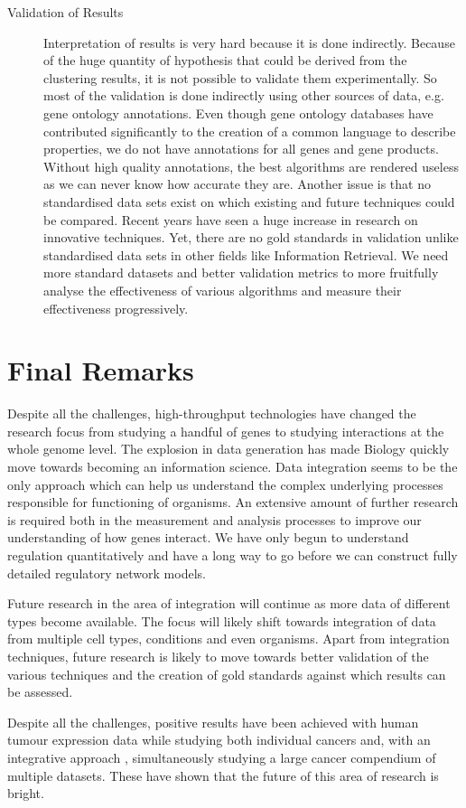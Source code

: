 \begin{description}
\item[Validation of Results] Interpretation of results is very hard because it is done indirectly. Because of the huge quantity of hypothesis that could be derived from the clustering results, it is not possible to validate them experimentally. So most of the validation is done indirectly using other sources of data, e.g. gene ontology annotations. Even though gene ontology databases have contributed significantly to the creation of a common language to describe properties, we do not have annotations for all genes and gene products. Without high quality annotations, the best algorithms are rendered useless as we can never know how accurate they are. Another issue is that no standardised data sets exist on which existing and future techniques could be compared. Recent years have seen a huge increase in research on innovative techniques. Yet, there are no gold standards in validation unlike standardised data sets in other fields like Information Retrieval. We need more standard datasets and better validation metrics to more fruitfully analyse the effectiveness of various algorithms and measure their effectiveness progressively.
 
\end{description}

\section{Final Remarks} 

Despite all the challenges, high-throughput technologies have changed the research focus from studying a handful of genes to studying interactions at the whole genome level. The explosion in data generation has made Biology quickly move towards becoming an information science. Data integration seems to be the only approach which can help us understand the complex underlying processes responsible for functioning of organisms. An extensive amount of further research is required both in the measurement and analysis processes to improve our understanding of how genes interact. We have only begun to understand regulation quantitatively and have a long way to go before we can construct fully detailed regulatory network models. 

Future research in the area of integration will continue as more data of different types become available. The focus will likely shift towards integration of data from multiple cell types, conditions and even organisms. Apart from integration techniques, future research is likely to move towards better validation of the various techniques and the creation of gold standards against which results can be assessed. 

Despite all the challenges, positive results have been achieved with human tumour expression data while studying both individual cancers and, with an integrative approach \citep{segal04module}, simultaneously studying a large cancer compendium of multiple datasets. These have shown that the future of this area of research is bright.